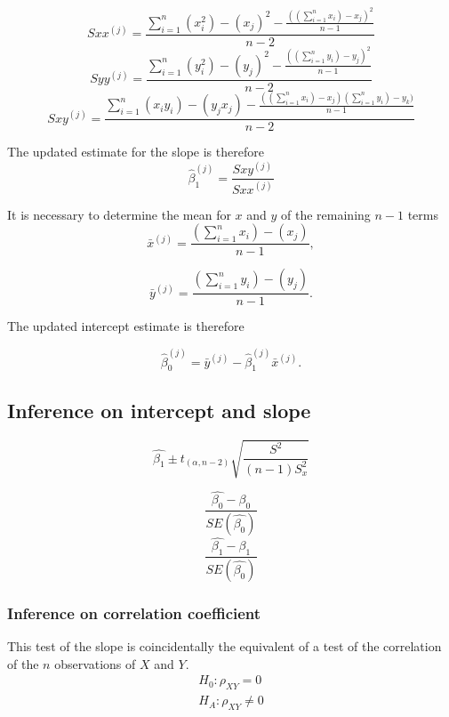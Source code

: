 \documentclass[a4paper,12pt]{article}
\begin{document}
\begin{equation}
Sxx^{(j)}=\frac{\sum_{i=1}^{n}(x_{i}^{2})-(x_{j})^{2}-\frac{((\sum_{i=1}^{n}x_{i})-x_{j})^{2}}{n-1}}{n-2}
\end{equation}
\begin{equation}
Syy^{(j)}=\frac{\sum_{i=1}^{n}(y_{i}^{2})-(y_{j})^{2}-\frac{((\sum_{i=1}^{n}y_{i})-y_{j})^{2}}{n-1}}{n-2}
\end{equation}
\begin{equation}
Sxy^{(j)}=\frac{\sum_{i=1}^{n}(x_{i}y_{i})-(y_{j}x_{j})-\frac{((\sum_{i=1}^{n}x_{i})-x_{j})(\sum_{i=1}^{n}y_{i})-y_{k})}{n-1}}{n-2}
\end{equation}


The updated estimate for the slope is therefore
\begin{equation}
\hat{\beta}_{1}^{(j)}=\frac{Sxy^{(j)}}{Sxx^{(j)}}
\end{equation}


It is necessary to determine the mean for $x$ and $y$ of the
remaining $n-1$ terms
\begin{equation}
\bar{x}^{(j)}=\frac{(\sum_{i=1}^{n}x_{i})-(x_{j})}{n-1},
\end{equation}


\begin{equation}
\bar{y}^{(j)}=\frac{(\sum_{i=1}^{n}y_{i})-(y_{j})}{n-1}.
\end{equation}


The updated intercept estimate is therefore


\begin{equation}
\hat{\beta}_{0}^{(j)}=\bar{y}^{(j)}-\hat{\beta}_{1}^{(j)}\bar{x}^{(j)}.
\end{equation}


\subsection{Inference on intercept and slope}
\begin{equation}
\hat{\beta_{1}} \pm t_{(\alpha, n-2) }
\sqrt{\frac{S^2}{(n-1)S^{2}_{x}}}
\end{equation}


\begin{equation}
\frac{\hat{\beta_{0}}-\beta_{0}}{SE(\hat{\beta_{0}})}
\end{equation}
\begin{equation}
\frac{\hat{\beta_{1}}-\beta_{1}}{SE(\hat{\beta_{0}})}
\end{equation}




\subsubsection{Inference on correlation coefficient} This test of
the slope is coincidentally the equivalent of a test of the
correlation of the $n$ observations of $X$ and $Y$.
\begin{eqnarray}
H_{0}: \rho_{XY} = 0 \nonumber \\
H_{A}: \rho_{XY} \ne 0 \nonumber \\
\end{eqnarray}
\end{document}
